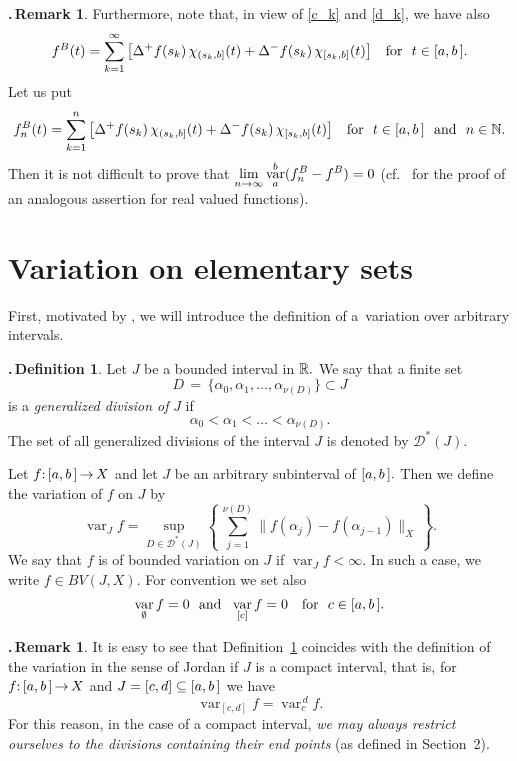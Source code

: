 \documentclass[12pt,twoside]{article}
\numberwithin{equation}{section}
\theoremstyle{plain}
\theoremstyle{definition}
\newtheorem{definition}[theorem]{\hskip-1mm.\,Definition}
\newtheorem{remark}[theorem]{\hskip-1mm.\,Remark}
\DeclareMathOperator{\var}{var}
\begin{document}
{\begin{remark}
Furthermore, note that, in view of \eqref{c_k} and \eqref{d_k}, we have also
\[
  f^B(t)=\sum_{k=1}^\infty
         \big[\Delta^+f(s_k)\,\chi_{(s_k,b]}(t)+\Delta^-f(s_k)\,\chi_{[s_k,b]}(t)\big]
  \quad\mbox{for \ } t\in[a,b\,].
\]
Let us put
\[
  f_n^B(t)=\sum_{k=1}^n
         \big[\Delta^+f(s_k)\,\chi_{(s_k,b]}(t)+\Delta^-f(s_k)\,\chi_{[s_k,b]}(t)\big]
  \quad\mbox{for \ } t\in[a,b\,] \mbox{ \ and \ } n\in{\mathbb N}.
\]
Then it is not difficult to prove that $\dis\lim_{n\to\infty}\var_a^b(f_n^B-f^B)=0$
(cf.~\cite[Lemma I.4.23]{STV} for the proof of an analogous assertion for real valued
functions).
\end{remark}


\section{Variation on elementary sets}\label{Sec4}
First, motivated by \cite[Definition 6.1]{G}, we will introduce the definition
of a~variation over arbitrary intervals.

\smallskip

\begin{definition}\label{var-J}
Let $J$ be a bounded interval in ${\mathbb R}.$ We say that a finite set
\[
   D\,{=}\,\{\alpha_0,\alpha_1,\dots,\alpha_{\nu(D)}\}\subset J
\]
is a {\em generalized division of} $J$ if
\[
   \alpha_0<\alpha_1<\dots<\alpha_{\nu(D)}.
\]
The set of all generalized divisions of the interval $J$ is denoted by $\mathcal{D^*}(J).$

Let $f{:}\,[a,b\,]\,{\to}\,X$ and let $J$ be an arbitrary subinterval of $[a,b\,].$
Then we define the variation of $f$ on $J$  by
\[
    \var_J f=\sup_{D\in\mathcal{D^*}(J)}
          \left\{\,\sum_{j=1}^{\nu(D)}\|f(\alpha_j)-f(\alpha_{j-1})\|_X\,\right\}.
\]
We say that $f$ is of bounded variation on $J$ if $\var_J f<\infty.$ In such a case,
we write $f\in BV(J,X).$ For convention we set also
\[
  \var_\emptyset f=0\mbox{ \ and \ }\var_{[c]} f=0\quad\mbox{for \ } c\in\ab.
\]
\end{definition}

\smallskip

\begin{remark}\label{P4.2}
It is easy to see that Definition~\ref{var-J} coincides with the definition of
the variation in the sense of Jordan if $J$ is a compact interval, that is, for
$f{:}\,[a,b\,]\,{\to}\,X$ and $J=[c,d]\subseteq[a,b\,]$ we have
\[
   \var_{[c,d]}f=\var_c^{\,d}f.
\]
For this reason, in the case of a compact interval, {\em we may always restrict
ourselves to the divisions containing their end points} (as defined in Section~2).


\end{remark}}
\end{document}
